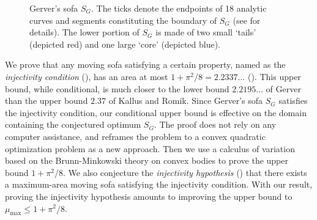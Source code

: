 \begin{figure}
\centering

\caption{Gerver’s sofa \(S_G\). The ticks denote the endpoints of 18 analytic curves and segments constituting the boundary of \(S_G\) (see \autocite{romikDifferentialEquationsExact2018} for details). The lower portion of \(S_G\) is made of two small ‘tails’ (depicted red) and one large ‘core’ (depicted blue).}
\label{fig:gerver}
\end{figure}

We prove that any moving sofa satisfying a certain property, named as the \emph{injectivity condition} (), has an area at most \(1 + \pi^2/8 = 2.2337\dots\) (). This upper bound, while conditional, is much closer to the lower bound \(2.2195\dots\) of Gerver than the upper bound \(2.37\) of Kallus and Romik. Since Gerver’s sofa \(S_G\) satisfies the injectivity condition, our conditional upper bound is effective on the domain containing the conjectured optimum \(S_G\). The proof does not rely on any computer assistance, and reframes the problem to a convex quadratic optimization problem as a new approach. Then we use a calculus of variation based on the Brunn-Minkowski theory on convex bodies to prove the upper bound \(1 + \pi^2/8\). We also conjecture the \emph{injectivity hypothesis} () that there exists a maximum-area moving sofa satisfying the injectivity condition. With our result, proving the injectivity hypothesis amounts to improving the upper bound to \(\mu_{\max} \leq 1 + \pi^2/8\).